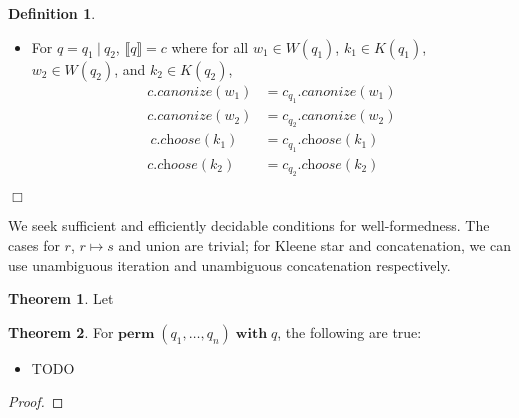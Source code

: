 \documentclass[a4paper,11pt] {article}
\theoremstyle{definition}
\newtheorem*{theorem*}{Theorem}
\newtheorem{definition}[theorem]{Definition}
\newcommand{\lcanonize}[1]{\textit{$#1$.canonize}}
\newcommand{\lchoose}[1]{\textit{$#1$.choose}}
\newcommand{\perm}{ \textbf{perm}\; }
\newcommand{\with}{ \;\textbf{with}\; }
\begin{document}
\begin{definition}
\begin{itemize}
  \item For $q = q_1 ~|~ q_2$, $\llbracket q \rrbracket = c$ where
    for all $w_1 \in W(q_1)$, $k_1 \in K(q_1)$, $w_2 \in W(q_2)$,
    and $k_2 \in K(q_2)$,
    \begin{align*}
      \lcanonize{c}(w_1) &=
      \lcanonize{c_{q_1}}(w_1) \\
      \lcanonize{c}(w_2) &=
      \lcanonize{c_{q_2}}(w_2) \\
      \
      \lchoose{c}(k_1) &=
      \lchoose{c_{q_1}}(k_1) \\      
      \lchoose{c}(k_2) &=
      \lchoose{c_{q_2}}(k_2)
    \end{align*}
  \end{itemize}
  \begin{flushright} $\Box$ \end{flushright}  
\end{definition}
We seek sufficient and efficiently decidable conditions for
well-formedness. The cases for $r$, $r \mapsto s$ and union are trivial;
for Kleene star and concatenation, we can use unambiguous iteration
and unambiguous concatenation respectively. 

\begin{theorem*}
Let 
\end{theorem*}


\begin{theorem*}
  For $\perm(q_1,\ldots, q_n) \with q$, the following are true:
  \begin{itemize}
  \item TODO
  \end{itemize}
\end{theorem*}
\begin{proof}

  

\end{proof}
\end{document}
